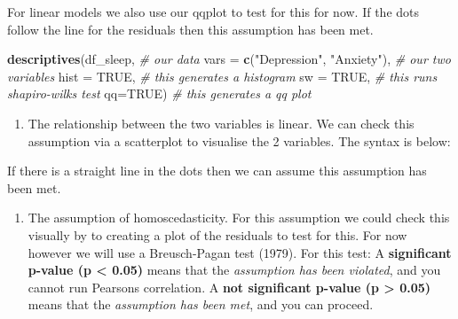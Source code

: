 \documentclass[
]{book}
\newenvironment{Shaded}{\begin{snugshade}}{\end{snugshade}}
\newcommand{\AttributeTok}[1]{\textcolor[rgb]{0.13,0.29,0.53}{#1}}
\newcommand{\CommentTok}[1]{\textcolor[rgb]{0.56,0.35,0.01}{\textit{#1}}}
\newcommand{\ConstantTok}[1]{\textcolor[rgb]{0.56,0.35,0.01}{#1}}
\newcommand{\FunctionTok}[1]{\textcolor[rgb]{0.13,0.29,0.53}{\textbf{#1}}}
\newcommand{\NormalTok}[1]{#1}
\newcommand{\SpecialCharTok}[1]{\textcolor[rgb]{0.81,0.36,0.00}{\textbf{#1}}}
\newcommand{\StringTok}[1]{\textcolor[rgb]{0.31,0.60,0.02}{#1}}
\providecommand{\tightlist}{%
  \setlength{\itemsep}{0pt}\setlength{\parskip}{0pt}}
\begin{document}
For linear models we also use our qqplot to test for this for now. If the dots follow the line for the residuals then this assumption has been met.

\begin{Shaded}
\begin{Highlighting}[]
\FunctionTok{descriptives}\NormalTok{(df\_sleep, }\CommentTok{\# our data}
             \AttributeTok{vars =} \FunctionTok{c}\NormalTok{(}\StringTok{"Depression"}\NormalTok{, }\StringTok{"Anxiety"}\NormalTok{), }\CommentTok{\# our two variables}
             \AttributeTok{hist =} \ConstantTok{TRUE}\NormalTok{, }\CommentTok{\# this generates a histogram}
             \AttributeTok{sw =} \ConstantTok{TRUE}\NormalTok{, }\CommentTok{\# this runs shapiro{-}wilks test}
             \AttributeTok{qq=}\ConstantTok{TRUE}\NormalTok{) }\CommentTok{\# this generates a qq plot }
\end{Highlighting}
\end{Shaded}

\begin{enumerate}
\def\labelenumi{\alph{enumi}.}
\setcounter{enumi}{3}
\tightlist
\item
  The relationship between the two variables is linear. We can check this assumption via a scatterplot to visualise the 2 variables. The syntax is below:
\end{enumerate}

\begin{Shaded}
\end{Shaded}

If there is a straight line in the dots then we can assume this assumption has been met.

\begin{enumerate}
\def\labelenumi{\alph{enumi}.}
\setcounter{enumi}{4}
\tightlist
\item
  The assumption of homoscedasticity. For this assumption we could check this visually by to creating a plot of the residuals to test for this. For now however we will use a Breusch-Pagan test (1979). For this test: A \textbf{significant p-value (p \textless{} 0.05)} means that the \emph{assumption has been violated}, and you cannot run Pearsons correlation. A \textbf{not significant p-value (p \textgreater{} 0.05)} means that the \emph{assumption has been met}, and you can proceed.
\end{enumerate}
\end{document}
